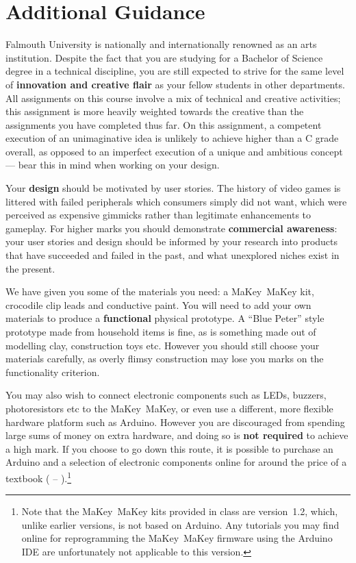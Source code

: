 \documentclass{../fal_assignment}
\begin{document}
\section*{Additional Guidance}

Falmouth University is nationally and internationally renowned as an arts institution.
Despite the fact that you are studying for a Bachelor of Science degree in a technical discipline,
you are still expected to strive for the same level of \textbf{innovation and creative flair}
as your fellow students in other departments.
All assignments on this course involve a mix of technical and creative activities;
this assignment is more heavily weighted towards the creative than the assignments you have completed thus far.
On this assignment, a competent execution of an unimaginative idea is unlikely to achieve higher than a C grade overall,
as opposed to an imperfect execution of a unique and ambitious concept
--- bear this in mind when working on your design.

Your \textbf{design} should be motivated by user stories.
The history of video games is littered with failed peripherals which consumers simply did not want,
which were perceived as expensive gimmicks rather than legitimate enhancements to gameplay.
For higher marks you should demonstrate \textbf{commercial awareness}:
your user stories and design should be informed by your research into products that have succeeded and failed
in the past, and what unexplored niches exist in the present.

We have given you some of the materials you need: a MaKey~MaKey kit, crocodile clip leads and conductive paint.
You will need to add your own materials to produce a \textbf{functional} physical prototype.
A ``Blue Peter'' style prototype made from household items is fine,
as is something made out of modelling clay, construction toys etc.
However you should still choose your materials carefully, as overly flimsy construction may
lose you marks on the functionality criterion.

You may also wish to connect electronic components such as LEDs, buzzers, photoresistors etc to the MaKey~MaKey,
or even use a different, more flexible hardware platform such as Arduino.
However you are discouraged from spending large sums of money on extra hardware,
and doing so is \textbf{not required} to achieve a high mark.
If you choose to go down this route,
it is possible to purchase an Arduino and a selection of electronic components online for 
around the price of a textbook ( -- ).\footnote{
    Note that the MaKey~MaKey kits provided in class are version~1.2, which, unlike earlier versions, is not based on Arduino.
    Any tutorials you may find online for reprogramming the MaKey~MaKey firmware using the Arduino IDE
    are unfortunately not applicable to this version.
}
\end{document}

